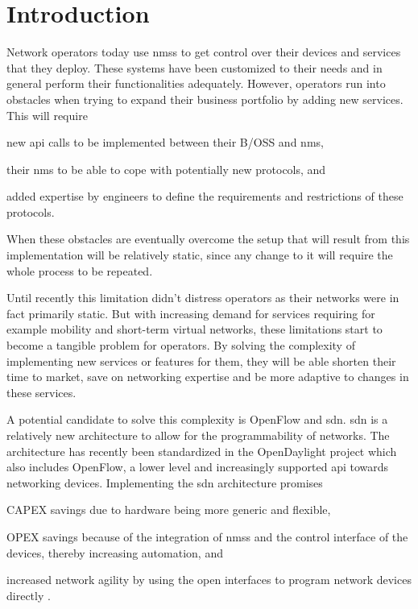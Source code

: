 \section{Introduction} %
\label{sec:introduction}
Network operators today use \acp{nms} to get control over their devices and services that they deploy. These systems have been customized to their needs and in general perform their functionalities adequately. However, operators run into obstacles when trying to expand their business portfolio by adding new services. This will require 
\begin{inparaenum}
	\item new \ac{api} calls to be implemented between their B/OSS and \ac{nms}, 
	\item their \ac{nms} to be able to cope with potentially new protocols, and
	\item added expertise by engineers to define the requirements and restrictions of these protocols. 
\end{inparaenum}
When these obstacles are eventually overcome the setup that will result from this implementation will be relatively static, since any change to it will require the whole process to be repeated.

Until recently this limitation didn't distress operators as their networks were in fact primarily static. But with increasing demand for services requiring for example mobility and short-term virtual networks, these limitations start to become a tangible problem for operators. By solving the complexity of implementing new services or features for them, they will be able shorten their time to market, save on networking expertise and be more adaptive to changes in these services. 

A potential candidate to solve this complexity is OpenFlow \cite{openflow} and \ac{sdn}. \ac{sdn} is a relatively new architecture to allow for the programmability of networks. The architecture has recently been standardized in the OpenDaylight project \cite{opendaylight} which also includes OpenFlow, a lower level and increasingly supported \ac{api} towards networking devices. Implementing the \ac{sdn} architecture promises
\begin{inparaenum}
	\item CAPEX savings due to hardware being more generic and flexible,
	\item OPEX savings because of the integration of \acp{nms} and the control interface of the devices, thereby increasing automation, and
	\item increased network agility by using the open interfaces to program network devices directly \cite{packet-circuit}.
	\end{inparaenum} 

